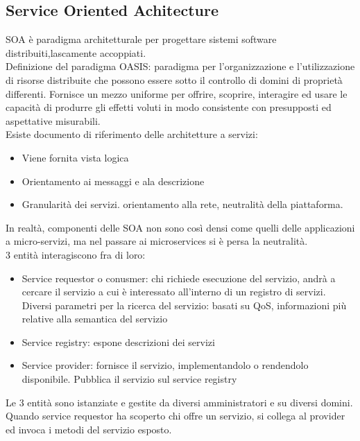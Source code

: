 \documentclass{article}
\begin{document}
\subsection{Service Oriented Achitecture}
SOA è paradigma architetturale per progettare sistemi software distribuiti,lascamente accoppiati. \\ Definizione del paradigma OASIS: paradigma per l'organizzazione e l'utilizzazione di risorse distribuite che possono essere sotto il controllo di domini di proprietà differenti. Fornisce un mezzo uniforme per offrire, scoprire, interagire ed usare le capacità di produrre gli effetti voluti in modo consistente con presupposti ed aspettative misurabili.\\ Esiste documento di riferimento delle architetture a servizi:
\begin{itemize}
\item Viene fornita vista logica
\item Orientamento ai messaggi e ala descrizione
\item Granularità dei servizi. orientamento alla rete, neutralità della piattaforma.
\end{itemize}
In realtà, componenti delle SOA non sono così densi come quelli delle applicazioni a micro-servizi, ma nel passare ai microservices si è persa la neutralità.\\ 3 entità interagiscono fra di loro:
\begin{itemize}
\item Service requestor o conusmer: chi richiede esecuzione del servizio, andrà a cercare il servizio a cui è interessato all'interno di un registro di servizi. Diversi parametri per la ricerca del servizio: basati su QoS, informazioni più relative alla semantica del servizio
\item Service registry: espone descrizioni dei servizi
\item Service provider: fornisce il servizio, implementandolo o rendendolo disponibile. Pubblica il servizio sul service registry
\end{itemize}
Le 3 entità sono istanziate e gestite da diversi amministratori e su diversi domini. Quando service requestor ha scoperto chi offre un servizio, si collega al provider ed invoca i metodi del servizio esposto.
\end{document}
